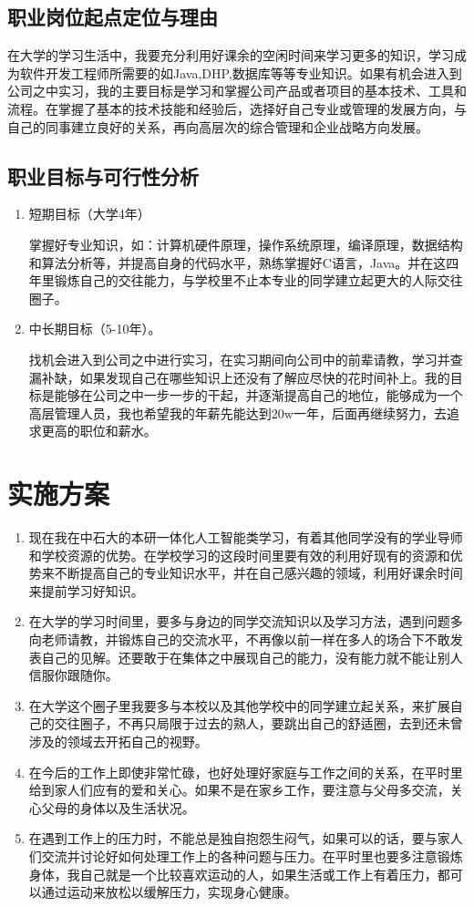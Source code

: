 \documentclass{article}
\begin{document}
\subsection{职业岗位起点定位与理由}
在大学的学习生活中，我要充分利用好课余的空闲时间来学习更多的知识，学习成为软件开发工程师所需要的如Java,DHP,数据库等等专业知识。如果有机会进入到公司之中实习，我的主要目标是学习和掌握公司产品或者项目的基本技术、工具和流程。在掌握了基本的技术技能和经验后，选择好自己专业或管理的发展方向，与自己的同事建立良好的关系，再向高层次的综合管理和企业战略方向发展。
\subsection{职业目标与可行性分析}
\par
\begin{enumerate}[(1)]
	\item 短期目标（大学4年）\par
	掌握好专业知识，如：计算机硬件原理，操作系统原理，编译原理，数据结构和算法分析等，并提高自身的代码水平，熟练掌握好C语言，Java。并在这四年里锻炼自己的交往能力，与学校里不止本专业的同学建立起更大的人际交往圈子。
	\item 中长期目标（5-10年）。\par
	找机会进入到公司之中进行实习，在实习期间向公司中的前辈请教，学习并查漏补缺，如果发现自己在哪些知识上还没有了解应尽快的花时间补上。我的目标是能够在公司之中一步一步的干起，并逐渐提高自己的地位，能够成为一个高层管理人员，我也希望我的年薪先能达到20w一年，后面再继续努力，去追求更高的职位和薪水。
\end{enumerate}

\section{实施方案}
\begin{enumerate}[1、]
	\item 现在我在中石大的本研一体化人工智能类学习，有着其他同学没有的学业导师和学校资源的优势。在学校学习的这段时间里要有效的利用好现有的资源和优势来不断提高自己的专业知识水平，并在自己感兴趣的领域，利用好课余时间来提前学习好知识。
	\item 在大学的学习时间里，要多与身边的同学交流知识以及学习方法，遇到问题多向老师请教，并锻炼自己的交流水平，不再像以前一样在多人的场合下不敢发表自己的见解。还要敢于在集体之中展现自己的能力，没有能力就不能让别人信服你跟随你。
	\item 在大学这个圈子里我要多与本校以及其他学校中的同学建立起关系，来扩展自己的交往圈子，不再只局限于过去的熟人，要跳出自己的舒适圈，去到还未曾涉及的领域去开拓自己的视野。
	\item 在今后的工作上即使非常忙碌，也好处理好家庭与工作之间的关系，在平时里给到家人们应有的爱和关心。如果不是在家乡工作，要注意与父母多交流，关心父母的身体以及生活状况。
	\item 在遇到工作上的压力时，不能总是独自抱怨生闷气，如果可以的话，要与家人们交流并讨论好如何处理工作上的各种问题与压力。在平时里也要多注意锻炼身体，我自己就是一个比较喜欢运动的人，如果生活或工作上有着压力，都可以通过运动来放松以缓解压力，实现身心健康。
\end{enumerate}
\par
\end{document}
